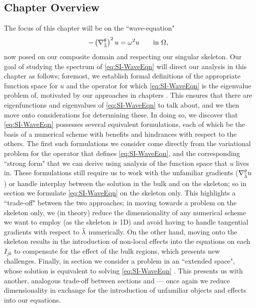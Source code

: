 \subsection{Chapter Overview} \label{ssec:SIOverview}
The focus of this chapter will be on the ``wave-equation"
\begin{align} \label{eq:SI-WaveEqn}
	-\left( \nabla^{\theta}_{\tilde{\lambda}} \right)^2 u = \omega^2 u \qquad\text{in } \Omega,
\end{align}
now posed on our composite domain and respecting our singular skeleton.
Our goal of studying the spectrum of \eqref{eq:SI-WaveEqn} will direct our analysis in this chapter as follows; foremost,  we establish formal definitions of the appropriate function space for $u$ and the operator for which \eqref{eq:SI-WaveEqn} is the eigenvalue problem of, motivated by our approaches in chapters .
This ensures that there are eigenfunctions and eigenvalues of \eqref{eq:SI-WaveEqn} to talk about, and we then move onto considerations for determining these.
In doing so, we discover that \eqref{eq:SI-WaveEqn} possesses several equivalent formulations, each of which be the basis of a numerical scheme with benefits and hindrances with respect to the others.
The first such formulations we consider   come directly from the variational problem for the operator that defines \eqref{eq:SI-WaveEqn}, and the corresponding ``strong form" that we can derive using analysis of the function space that $u$ lives in.
These formulations still require us to work with the unfamiliar gradients ($\nabla^{\theta}_{\tilde{\lambda}}u$) or handle interplay between the solution in the bulk and on the skeleton; so in section  we formulate \eqref{eq:SI-WaveEqn} on the skeleton only.
This highlights a ``trade-off" between the two approaches; in moving towards a problem on the skeleton only, we (in theory) reduce the dimensionality of any numerical scheme we want to employ (as the skeleton is 1D) and avoid having to handle tangential gradients with respect to $\tilde{\lambda}$ numerically.
On the other hand, moving onto the skeleton results in the introduction of non-local effects into the equations on each $I_{jk}$ to compensate for the effect of the bulk regions, which presents new challenges.
Finally, in section  we consider a problem in an ``extended space", whose solution is equivalent to solving \eqref{eq:SI-WaveEqn} .
This presents us with another, analogous trade-off between sections  and  --- once again we reduce dimensionality in exchange for the introduction of unfamiliar objects and effects into our equations.

